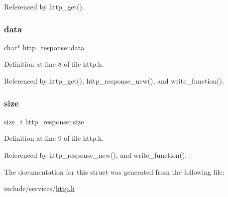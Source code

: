 Referenced by http\+\_\+get().

\mbox{\label{structhttp__response_a6d1634ea52b1d8e59a3c6fb387e5b187}} 
\subsubsection{\texorpdfstring{data}{data}}
{\footnotesize\ttfamily char$\ast$ http\+\_\+response\+::data}



Definition at line 8 of file http.\+h.



Referenced by http\+\_\+get(), http\+\_\+response\+\_\+new(), and write\+\_\+function().

\mbox{\label{structhttp__response_a652d9d52a9d94b4e80a591bc42b704f9}} 
\subsubsection{\texorpdfstring{size}{size}}
{\footnotesize\ttfamily size\+\_\+t http\+\_\+response\+::size}



Definition at line 9 of file http.\+h.



Referenced by http\+\_\+response\+\_\+new(), and write\+\_\+function().



The documentation for this struct was generated from the following file\+:\begin{DoxyCompactItemize}
\item 
include/services/\mbox{\hyperlink{http_8h}{http.\+h}}\end{DoxyCompactItemize}
